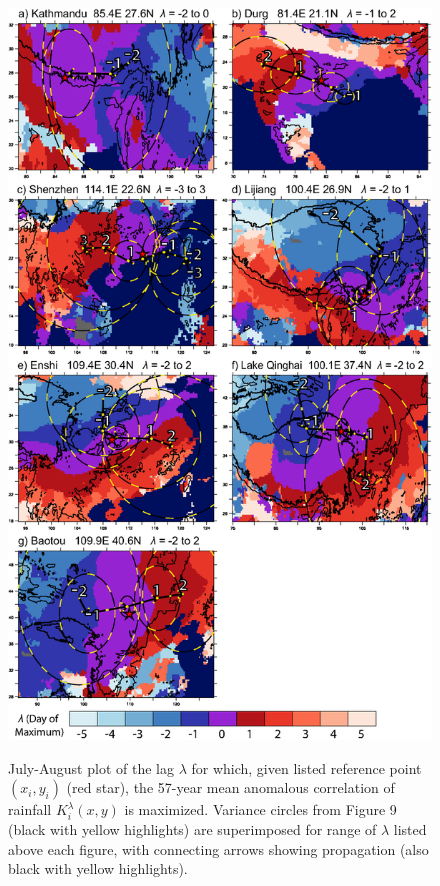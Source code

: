 \begin{figure}[t]
  \noindent\includegraphics[width=31pc,angle=0]{Figures/ch2/fig9kmax}\\
  \caption{July-August plot of the lag $\lambda$ for which, given listed reference point $(x_i,y_i)$ (red star), the 57-year mean anomalous correlation of rainfall $K_i^\lambda(x,y)$ is maximized. Variance circles from Figure 9 (black with yellow highlights) are superimposed for range of $\lambda$ listed above each figure, with connecting arrows showing propagation (also black with yellow highlights).}
  \label{fig:f29}
\end{figure}

